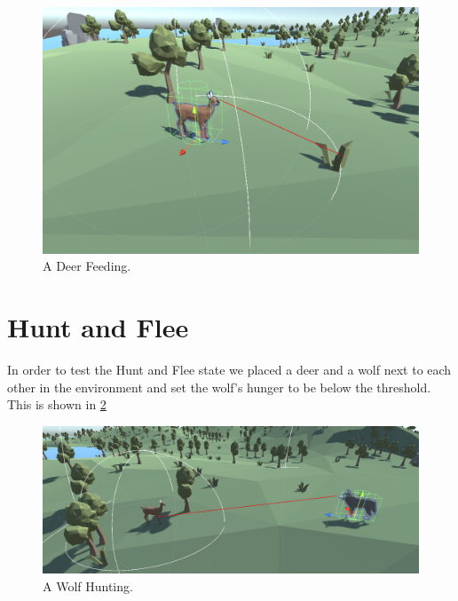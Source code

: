 \documentclass[a4paper, oneside, 11pt]{report}
\begin{document}
	\begin{figure}
		\includegraphics[width=\linewidth]{Deer Feeding.png}
		\caption{A Deer Feeding.}
		\label{fig:Deer Feeding}
	\end{figure}
	
\section{Hunt and Flee}
	In order to test the Hunt and Flee state we placed a deer and a wolf next to each other in the environment and set the wolf's hunger to be below the threshold. This is shown in \ref{fig:Wolf Hunting}
	
	\begin{figure}
		\includegraphics[width=\linewidth]{Wolf Hunting.png}
		\caption{A Wolf Hunting.}
		\label{fig:Wolf Hunting}
	\end{figure}
\end{document}

